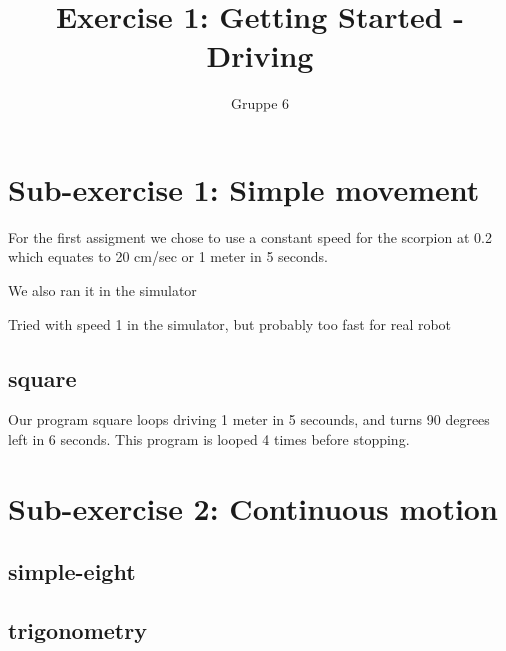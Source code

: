 \documentclass[a4paper,12pt]{article}
\title{Exercise 1: Getting Started - Driving}
\author{Gruppe 6}
\begin{document}
\maketitle

\section{ Sub-exercise 1: Simple movement}

For the first assigment we chose to use a constant speed for the scorpion at 0.2 which equates to 20 cm/sec or 1 meter in 5 seconds.

We also ran it in the simulator

Tried with speed 1 in the simulator, but probably too fast for real robot

\subsection{square}

Our program square loops driving 1 meter in 5 secounds,  and turns 90 degrees left in 6 seconds. This program is looped 4 times before stopping.

\section{ Sub-exercise 2: Continuous motion}

\subsection{simple-eight}

\subsection{trigonometry}
\end{document}
